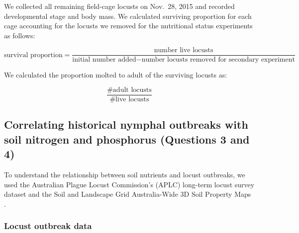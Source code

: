 \documentclass[
]{article}
\begin{document}
We collected all remaining field-cage locusts on Nov.~28, 2015 and
recorded developmental stage and body mass. We calculated surviving
proportion for each cage accounting for the locusts we removed for the
nutritional status experiments as follows:

\[
\text{survival proportion} = \frac{\text{number live locusts}}{\text{initial number added} - \text{number locusts removed for secondary experiment}}
\]

We calculated the proportion molted to adult of the surviving locusts
as:

\[
\frac{\text{\# adult locusts}}{\text{\# live locusts}}
\]

\subsection{Correlating historical nymphal outbreaks with soil nitrogen
and phosphorus (Questions 3 and
4)}\label{correlating-historical-nymphal-outbreaks-with-soil-nitrogen-and-phosphorus-questions-3-and-4}

To understand the relationship between soil nutrients and locust
outbreaks, we used the Australian Plague Locust Commission's (APLC)
long-term locust survey dataset \citep{deveson_operation_2002} and the
Soil and Landscape Grid Australia-Wide 3D Soil Property Maps
\citep{grundy_soil_2015}.

\subsubsection{Locust outbreak data}\label{locust-outbreak-data}
\end{document}
